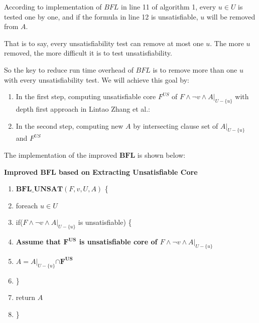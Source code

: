 \documentclass[journal]{IEEEtran}
\begin{document}
According to implementation of $BFL$ in line 11 of algorithm 1,
every $u\in U$ is tested one by one,
and if the formula in line 12 is unsatisfiable,
$u$ will be removed from $A$.

That is to say,
every unsatisfiability test can remove at most one $u$.
The more $u$ removed,
the more difficult it is to test unsatisfiability.

So the key to reduce run time overhead of $BFL$ is to remove more than one $u$ with every unsatisfiability test.
We will achieve this goal by:
\begin{enumerate}
\item In the first step,
computing unsatisfiable core $F^{US}$ of $F\wedge \neg v\wedge A|_{U -\{u\}}$ with depth first approach in Lintao Zhang et al.\cite{VALIDSAT}:
\item In the second step,
computing new $A$ by intersecting clause set of $A|_{U-\{u\}}$ and $F^{US}$
\end{enumerate}

The implementation of the improved $\boldsymbol{BFL}$ is shown below:
\vspace{0.2cm}
\begin{algo}
\textbf{Improved $\boldsymbol{BFL}$ based on Extracting Unsatisfiable Core}
\begin{enumerate}
\item $\boldsymbol{BFL\_UNSAT}(F,v,U,A)$ \{
\item \hspace{0.3cm} foreach $u\in U$
\item \hspace{0.6cm}  if($F\wedge \neg v\wedge A|_{U -\{u\}}$ is unsatisfiable) \{
\item \hspace{0.9cm}     \textbf{Assume that $\boldsymbol{F^{US}}$ is unsatisfiable core of $F\wedge \neg v\wedge A|_{U -\{u\}}$}
\item \hspace{0.9cm}     $A= A|_{U -\{u\}}\boldsymbol{\cap F^{US}}$
\item \hspace{0.6cm} \}
\item \hspace{0.3cm} return $A$
\item \}
\end{enumerate}
\end{algo}
\end{document}
